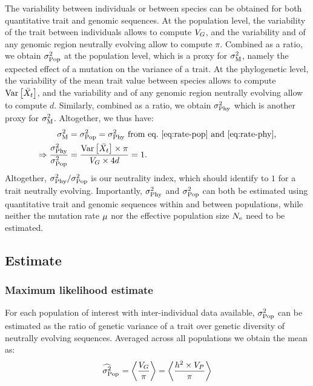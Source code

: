 \documentclass{article}
\begin{document}
 The variability between individuals or between species can be obtained for both quantitative trait and genomic sequences.
 At the population level, the variability of the trait between individuals allows to compute $V_{G}$, and the variability and of any genomic region neutrally evolving allow to compute $\pi$.
Combined as a ratio, we obtain $\sigma^2_{\text{Pop}}$ at the population level, which is a proxy for $\sigma^2_{\text{M}}$, namely the expected effect of a mutation on the variance of a trait.
At the phylogenetic level, the variability of the mean trait value between species allows to compute $\operatorname{\text{Var}} \left[\bar{X_{t}}\right]$, and the variability and of any genomic region neutrally evolving allow to compute $d$.
Similarly, combined as a ratio, we obtain $\sigma^2_{\text{Phy}}$ which is another proxy for $\sigma^2_{\text{M}}$.
Altogether, we thus have:
\begin{align}
    \sigma^2_{\text{M}} & = \sigma^2_{\text{Pop}} = \sigma^2_{\text{Phy}} \text{ from eq.~\ref{eq:rate-pop} and~\ref{eq:rate-phy}} , \\
    \Rightarrow \frac{\sigma^2_{\text{Phy}}}{\sigma^2_{\text{Pop}}} & = \frac{\operatorname{\text{Var}} \left[\bar{X_{t}}\right] \times \pi}{ V_{G} \times 4 d }  = 1.
\end{align}
Altogether, $\sigma^2_{\text{Phy}} / \sigma^2_{\text{Pop}}$ is our neutrality index, which should identify to $1$ for a trait neutrally evolving.
Importantly, $\sigma^2_{\text{Phy}}$ and $\sigma^2_{\text{Pop}}$ can both be estimated using quantitative trait and genomic sequences within and between populations, while neither the mutation rate $\mu$ nor the effective population size $N_{\text{e}}$ need to be estimated.

\subsection{Estimate}

\subsubsection{Maximum likelihood estimate}
For each population of interest with inter-individual data available, $\sigma^2_{\text{Pop}}$ can be estimated as the ratio of genetic variance of a trait over genetic diversity of neutrally evolving sequences.
Averaged across all populations we obtain the mean as:
\begin{gather}
    \EstRatePop = \left< \frac{\VarGenetic}{\pi} \right> = \left< \frac{h^2 \Multiply \VarPhenotype }{\pi } \right> \label{eq:estimated-rate-pop}
\end{gather}
\end{document}

